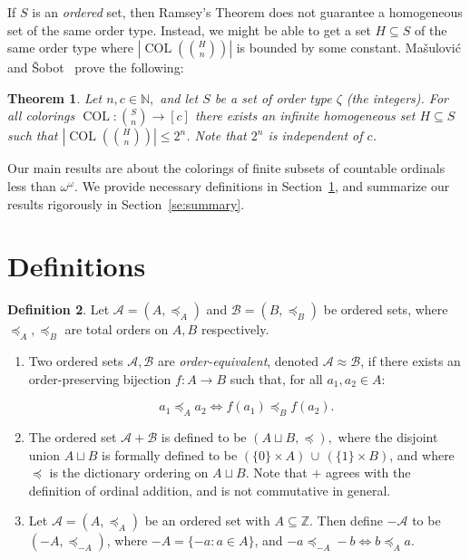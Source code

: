 \documentclass[10pt,a4paper]{article}
\newcommand{\oequiv}{\approx}
\newcommand{\setconcat}{+}
\newcommand{\COL}{\operatorname{COL}}
\newcommand{\N}{\mathbb{N}}
\newcommand{\Z}{\mathbb{Z}}
\newcommand{\numpoints}{n}
\newcommand{\numcolors}{c}
\theoremstyle{plain}
\newtheorem{theorem}{Theorem}[section]
\theoremstyle{definition}
\newtheorem{definition}[theorem]{Definition}
\begin{document}
If $S$ is an \textit{ordered} set, then Ramsey's Theorem does not guarantee a
homogeneous set of the same order type. Instead, we might be able to get a set $H\subseteq S$ of the same order type where $\left|\COL\left(\binom{H}{\numpoints}\right)\right|$ is bounded by some constant. Ma\v{s}ulovi\'{c} and \v{S}obot~\cite{MS-2021} prove the following:

\begin{theorem} 
Let $\numpoints,\numcolors\in\N,$ and let $S$ be a set
of order type $\zeta$ (the integers).
For all colorings $\COL\colon \binom{S}{\numpoints}\to [\numcolors]$ 
there exists an infinite homogeneous set $H\subseteq S$ such that 
$\left|\COL\left(\binom{H}{\numpoints}\right)\right|\le 2^n$. Note that $2^n$ is independent of 
$\numcolors$. 
\end{theorem} 

Our main results are about the colorings of finite subsets of countable ordinals less than $\omega^\omega$. 
We provide necessary definitions in Section~\ref{se:defs},
and summarize our results rigorously in Section~\ref{se:summary}. 

\section{Definitions}\label{se:defs}


\begin{definition} 
Let $\mathcal{A} = (A,\preceq_A)$ and $\mathcal{B} = (B,\preceq_B)$ be ordered sets, where
$\preceq_A, \preceq_B$ are total orders on $A, B$ respectively.

\begin{enumerate}

\item Two ordered sets
$\mathcal{A},\mathcal{B}$ are \textit{order-equivalent}, denoted $\mathcal{A}\oequiv \mathcal{B}$, 
if there exists an order-preserving bijection $f\colon A \to B$ such that, for all $a_1, a_2 \in A$: 

$$a_1 \preceq_A a_2 \iff f(a_1) \preceq_B f(a_2).$$

\item 
The ordered set $\mathcal{A} \setconcat \mathcal{B}$ is defined to be
$(A\sqcup B, \preceq),$ where the disjoint union $A\sqcup B$ is formally defined to be
$(\{0\} \times A) \, \cup\, (\{1\} \times B)$, and where $\preceq$ is the dictionary ordering on $A\sqcup B.$
Note that $\setconcat$ agrees with the definition of ordinal addition, and is not commutative in general.

\item 
Let $\mathcal{A}=(A,\preceq_A)$ be an ordered set with $A \subseteq \Z$. Then define $-\mathcal{A}$ to be $(-A,\preceq_{-A})$, where 
$-A = \{ -a \colon a \in A\}$, and
$-a \preceq_{-A} -b \iff b \preceq_{A} a$.
\end{enumerate} 

\end{definition} 
\end{document}
